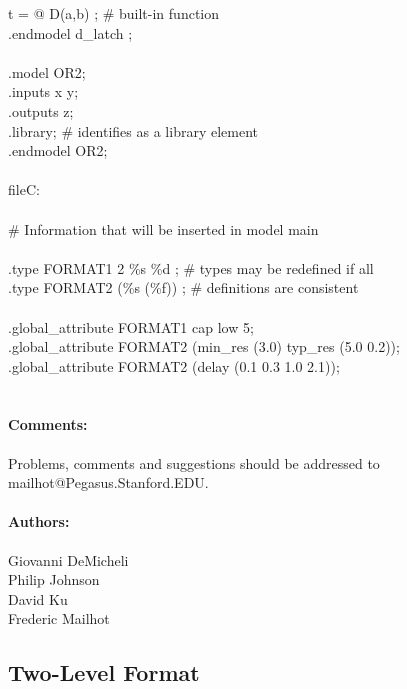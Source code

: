 {\begin{pespace}
\begin{tabbing}
      t = @ D(a,b) ; \> \> \> \> \> \>\# built-in function \\
      .endmodel d\_latch ; \\
 \\
      .model OR2; \\
      .inputs x y; \\
      .outputs z; \\
      .library;     \> \> \> \> \> \> \# identifies as a library element \\
      .endmodel OR2; \\
 \\
     fileC: \\
 \\
      \#      Information that will be inserted in model main \\
 \\
      .type FORMAT1 2 \%s \%d ; \> \> \> \> \> \> \# types may be redefined if all \\
      .type FORMAT2 (\%s (\%f)) ; \> \> \> \> \> \>\# definitions are consistent \\
 \\
      .global\_attribute FORMAT1 cap low 5; \\
      .global\_attribute FORMAT2 (min\_res (3.0) typ\_res (5.0 0.2)); \\
      .global\_attribute FORMAT2 (delay (0.1 0.3 1.0 2.1)); \\
 \\
\end{tabbing}

\paragraph{Comments:}
     Problems, comments and suggestions should be addressed to
     mailhot@Pegasus.Stanford.EDU.


\paragraph{Authors:}
     Giovanni DeMicheli \\
     Philip Johnson \\
     David Ku \\
     Frederic Mailhot \\



\newpage
\subsection{ Two-Level Format }


\end{pespace}}
